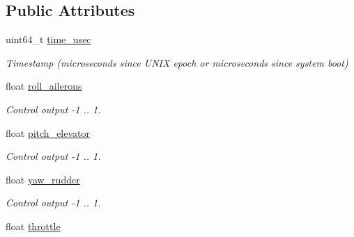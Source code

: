 \subsection*{Public Attributes}
\begin{DoxyCompactItemize}
\item 
\hypertarget{struct____mavlink__hil__controls__t_a209e91b6d93c47abba3dc4ed3c6625f2}{uint64\+\_\+t \hyperlink{struct____mavlink__hil__controls__t_a209e91b6d93c47abba3dc4ed3c6625f2}{time\+\_\+usec}}\label{struct____mavlink__hil__controls__t_a209e91b6d93c47abba3dc4ed3c6625f2}

\begin{DoxyCompactList}\small\item\em Timestamp (microseconds since U\+N\+I\+X epoch or microseconds since system boot) \end{DoxyCompactList}\item 
\hypertarget{struct____mavlink__hil__controls__t_a65303ffed89e791c1551bf41d3d764dc}{float \hyperlink{struct____mavlink__hil__controls__t_a65303ffed89e791c1551bf41d3d764dc}{roll\+\_\+ailerons}}\label{struct____mavlink__hil__controls__t_a65303ffed89e791c1551bf41d3d764dc}

\begin{DoxyCompactList}\small\item\em Control output -\/1 .. 1. \end{DoxyCompactList}\item 
\hypertarget{struct____mavlink__hil__controls__t_ae1da8c6e2be5e9927f9748671d901764}{float \hyperlink{struct____mavlink__hil__controls__t_ae1da8c6e2be5e9927f9748671d901764}{pitch\+\_\+elevator}}\label{struct____mavlink__hil__controls__t_ae1da8c6e2be5e9927f9748671d901764}

\begin{DoxyCompactList}\small\item\em Control output -\/1 .. 1. \end{DoxyCompactList}\item 
\hypertarget{struct____mavlink__hil__controls__t_addcaf6167ddb280643e69558a0532dd8}{float \hyperlink{struct____mavlink__hil__controls__t_addcaf6167ddb280643e69558a0532dd8}{yaw\+\_\+rudder}}\label{struct____mavlink__hil__controls__t_addcaf6167ddb280643e69558a0532dd8}

\begin{DoxyCompactList}\small\item\em Control output -\/1 .. 1. \end{DoxyCompactList}\item 
\hypertarget{struct____mavlink__hil__controls__t_a9249963d6b4959b9cbc952ad86e2a2f1}{float \hyperlink{struct____mavlink__hil__controls__t_a9249963d6b4959b9cbc952ad86e2a2f1}{throttle}}\label{struct____mavlink__hil__controls__t_a9249963d6b4959b9cbc952ad86e2a2f1}


\end{DoxyCompactItemize}
